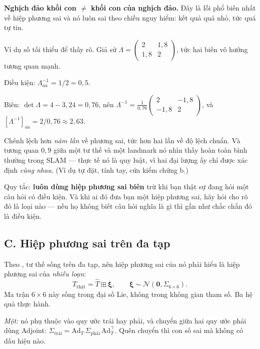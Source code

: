 \documentclass[../../vslam.tex]{subfiles}
\begin{document}
\begin{cambay}
\textbf{Nghịch đảo khối con \(\neq\) khối con của nghịch đảo.} Đây là lỗi phổ biến nhất về hiệp phương sai và nó luôn sai theo chiều nguy hiểm: kết quả quá nhỏ, tức quá tự tin.

Ví dụ số tối thiểu để thấy rõ. Giả sử \(\Lambda = \begin{pmatrix} 2 & 1{,}8 \\ 1{,}8 & 2\end{pmatrix}\), tức hai biến vô hướng tương quan mạnh.

Điều kiện: \(\Lambda_{aa}^{-1} = 1/2 = 0{,}5\).

Biên: \(\det\Lambda = 4 - 3{,}24 = 0{,}76\), nên \(\Lambda^{-1} = \frac{1}{0{,}76}\begin{pmatrix} 2 & -1{,}8 \\ -1{,}8 & 2\end{pmatrix}\), và \([\Lambda^{-1}]_{aa} = 2/0{,}76 \approx 2{,}63\).

Chênh lệch hơn \emph{năm lần} về phương sai, tức hơn hai lần về độ lệch chuẩn. Và tương quan \(0{,}9\) giữa một tư thế và một landmark nó nhìn thấy hoàn toàn bình thường trong SLAM --- thực tế nó là quy luật, vì hai đại lượng ấy chỉ được xác định \emph{cùng nhau}. (Ví dụ tự đặt, tính tay, cửa kiểm chứng b.)

Quy tắc: \textbf{luôn dùng hiệp phương sai biên} trừ khi bạn thật sự đang hỏi một câu hỏi có điều kiện. Và khi ai đó đưa bạn một hiệp phương sai, hãy hỏi cho rõ đó là loại nào --- nếu họ không biết câu hỏi nghĩa là gì thì gần như chắc chắn đó là điều kiện.
\end{cambay}

\subsection{C. Hiệp phương sai trên đa tạp}

Theo , tư thế sống trên đa tạp, nên hiệp phương sai của nó phải hiểu là hiệp phương sai của \emph{nhiễu loạn}:
\[
T_{\text{thật}} = \hat{T} \boxplus \boldsymbol{\xi},
\qquad \boldsymbol{\xi} \sim \mathcal{N}(\mathbf{0}, \Sigma_{6\times 6}).
\]
Ma trận \(6\times6\) này sống trong đại số Lie, không trong không gian tham số. Ba hệ quả thực hành.

\emph{Một:} nó phụ thuộc vào quy ước trái hay phải, và chuyển giữa hai quy ước phải dùng Adjoint: \(\Sigma_{\text{trái}} = \mathrm{Ad}_T\,\Sigma_{\text{phải}}\,\mathrm{Ad}_T^{\top}\). Quên chuyển thì con số sai mà không có dấu hiệu nào.
\end{document}
